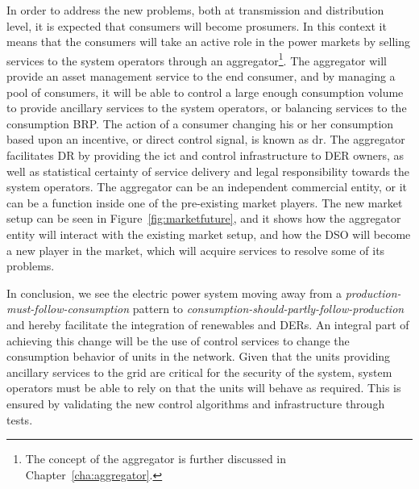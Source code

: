 In order to address the new problems, both at transmission and distribution level, it is expected that consumers will become prosumers. In this context it means that the consumers will take an active role in the power markets by selling services to the system operators through an aggregator\footnote[][6em]{The concept of the aggregator is further discussed in Chapter~\ref{cha:aggregator}.}. The aggregator will provide an asset management service to the end consumer, and by managing a pool of consumers, it will be able to control a large enough consumption volume to provide ancillary services to the system operators, or balancing services to the consumption BRP. The action of a consumer changing his or her consumption based upon an incentive, or direct control signal, is known as \gls{dr}. The aggregator facilitates DR by providing the \gls{ict} and control infrastructure to DER owners, as well as statistical certainty of service delivery and legal responsibility towards the system operators. The aggregator can be an independent commercial entity, or it can be a function inside one of the pre-existing market players. The new market setup can be seen in Figure~\ref{fig:marketfuture}, and it shows how the aggregator entity will interact with the existing market setup, and how the DSO will become a new player in the market, which will acquire services to resolve some of its problems.

In conclusion, we see the electric power system moving away from a \emph{production-must-follow-consumption} pattern to \emph{consumption-should-partly-follow-production} and hereby facilitate the integration of renewables and DERs. An integral part of achieving this change will be the use of control services to change the consumption behavior of units in the network. Given that the units providing ancillary services to the grid are critical for the security of the system, system operators must be able to rely on that the units will behave as required. This is ensured by validating the new control algorithms and infrastructure through tests.



